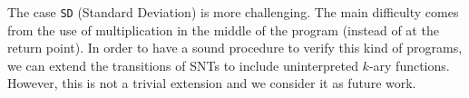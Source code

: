 






The case \texttt{SD} (Standard Deviation) is more challenging. The main difficulty comes from the use of multiplication in the middle of the program (instead of at the return point). In order to have a sound procedure to verify this kind of programs, we can extend the transitions of SNTs to include uninterpreted $k$-ary functions. However, this is not a trivial extension and we consider it as future work.


